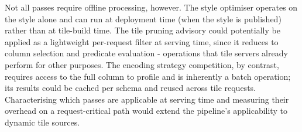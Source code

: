 \begin{itemize}
    Not all passes require offline processing, however.
    The style optimiser operates on the style alone and can run at deployment time (when the style is published) rather than at tile-build time.
    The tile pruning advisory could potentially be applied as a lightweight per-request filter at serving time, since it reduces to column selection and predicate evaluation - operations that tile servers already perform for other purposes.
    The encoding strategy competition, by contrast, requires access to the full column to profile and is inherently a batch operation; its results could be cached per schema and reused across tile requests.
    Characterising which passes are applicable at serving time and measuring their overhead on a request-critical path would extend the pipeline's applicability to dynamic tile sources.
\end{itemize}
